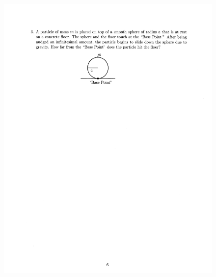 \documentclass[10pt,a4paper]{article}
\begin{document}
\begin{figure}[H]
 \centering
 \includegraphics[width=16cm]{pdf/1-1T41.png}
\end{figure}
 \newpage
\end{document}
